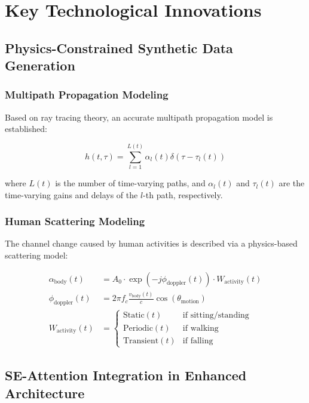 \section{Key Technological Innovations}
\label{sec:innovations}

\subsection{Physics-Constrained Synthetic Data Generation}
\label{subsec:physics_constrained}

\subsubsection{Multipath Propagation Modeling}
Based on ray tracing theory, an accurate multipath propagation model is established:

\begin{equation}
h(t, \tau) = \sum_{l=1}^{L(t)} \alpha_l(t) \delta(\tau - \tau_l(t))
\label{eq:multipath_model}
\end{equation}

where $L(t)$ is the number of time-varying paths, and $\alpha_l(t)$ and $\tau_l(t)$ are the time-varying gains and delays of the $l$-th path, respectively.

\subsubsection{Human Scattering Modeling}
The channel change caused by human activities is described via a physics-based scattering model:

\begin{align}
\alpha_{\text{body}}(t) &= A_0 \cdot \exp(-j\phi_{\text{doppler}}(t)) \cdot W_{\text{activity}}(t) \\
\phi_{\text{doppler}}(t) &= 2\pi f_c \frac{v_{\text{body}}(t)}{c} \cos(\theta_{\text{motion}}) \\
W_{\text{activity}}(t) &= \begin{cases}
\text{Static}(t) & \text{if sitting/standing} \\
\text{Periodic}(t) & \text{if walking} \\
\text{Transient}(t) & \text{if falling}
\end{cases}
\end{align}

\subsection{SE-Attention Integration in Enhanced Architecture}
\label{subsec:se_attention}

